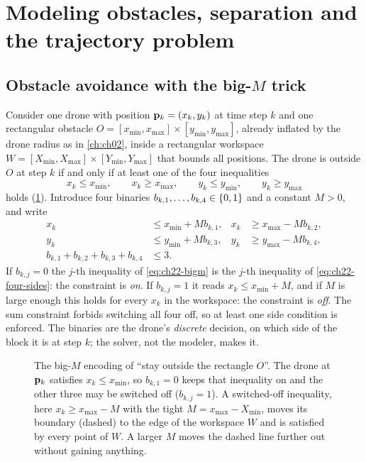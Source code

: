 \section[Modeling obstacles and separation]{Modeling obstacles, separation and the trajectory problem}
\label{sec:ch22-model}

\subsection{Obstacle avoidance with the big-\texorpdfstring{$M$}{M} trick}
\label{sec:ch22-bigm}

Consider one drone with position $\mathbf{p}_k = (x_k, y_k)$ at time step $k$ and
one rectangular obstacle $O = [x_{\min}, x_{\max}] \times [y_{\min},
y_{\max}]$, already inflated by the drone radius as in \cref{ch:ch02}, inside
a rectangular workspace $W = [X_{\min}, X_{\max}] \times [Y_{\min}, Y_{\max}]$
that bounds all positions. The drone is outside $O$ at step $k$ if and only
if at least one of the four inequalities
\begin{equation}
  x_k \le x_{\min}, \qquad x_k \ge x_{\max}, \qquad y_k \le y_{\min}, \qquad y_k \ge y_{\max}
  \label{eq:ch22-four-sides}
\end{equation}
holds (\cref{fig:ch22-bigm}). Introduce four binaries $b_{k,1}, \dots,
b_{k,4} \in \left\{ 0,1 \right\}$ and a constant $M > 0$, and write
\begin{equation}
\begin{aligned}
  x_k &\le x_{\min} + M b_{k,1}, & x_k &\ge x_{\max} - M b_{k,2},\\
  y_k &\le y_{\min} + M b_{k,3}, & y_k &\ge y_{\max} - M b_{k,4},\\
  b_{k,1} + b_{k,2} + b_{k,3} + b_{k,4} &\le 3.
\end{aligned}
\label{eq:ch22-bigm}
\end{equation}
If $b_{k,j} = 0$ the $j$-th inequality of \cref{eq:ch22-bigm} is the $j$-th
inequality of \cref{eq:ch22-four-sides}: the constraint is \emph{on}. If
$b_{k,j} = 1$ it reads $x_k \le x_{\min} + M$, and if $M$ is large enough
this holds for every $x_k$ in the workspace: the constraint is \emph{off}.
The sum constraint forbids switching all four off, so at least one side
condition is enforced. The binaries are the drone's \emph{discrete}
decision, on which side of the block it is at step $k$; the solver, not the
modeler, makes it.

\begin{figure}[tb]
  \centering
  \caption{The big-$M$ encoding of ``stay outside the rectangle $O$''. The
  drone at $\mathbf{p}_k$ satisfies $x_k \le x_{\min}$, so $b_{k,1} = 0$ keeps that
  inequality on and the other three may be switched off ($b_{k,j} = 1$). A
  switched-off inequality, here $x_k \ge x_{\max} - M$ with the tight
  $M = x_{\max} - X_{\min}$, moves its boundary (dashed) to the edge of the
  workspace $W$ and is satisfied by every point of $W$. A larger $M$ moves
  the dashed line further out without gaining anything.}
  \label{fig:ch22-bigm}
\end{figure}

